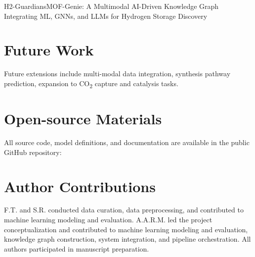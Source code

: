 \begin{teamsubmission}{H2-Guardians}{MOF-Genie: A Multimodal AI-Driven Knowledge Graph Integrating ML, GNNs, and LLMs for Hydrogen Storage Discovery}
\section*{Future Work}
Future extensions include multi-modal data integration, synthesis pathway prediction, expansion to CO\textsubscript{2} capture and catalysis tasks.

\section*{Open-source Materials}
All source code, model definitions, and documentation are available in the public GitHub repository:  

\section*{Author Contributions}
F.T. and S.R. conducted data curation, data preprocessing, and contributed to machine learning modeling and evaluation. A.A.R.M. led the project conceptualization and contributed to machine learning modeling and evaluation, knowledge graph construction, system integration, and pipeline orchestration. All authors participated in manuscript preparation. 
\end{teamsubmission}




